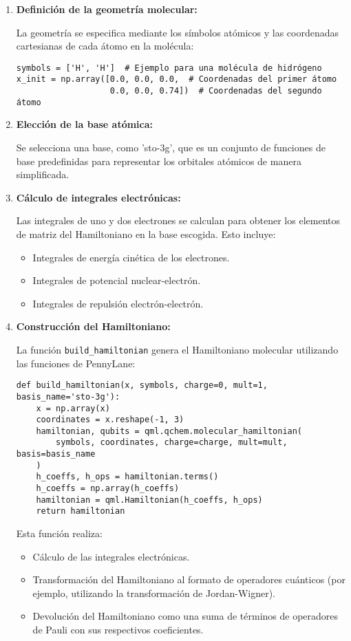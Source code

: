 \begin{enumerate}
    \item \textbf{Definición de la geometría molecular:}
    
    La geometría se especifica mediante los símbolos atómicos y las coordenadas cartesianas de cada átomo en la molécula:
    
    \begin{verbatim}
symbols = ['H', 'H']  # Ejemplo para una molécula de hidrógeno
x_init = np.array([0.0, 0.0, 0.0,  # Coordenadas del primer átomo
                   0.0, 0.0, 0.74])  # Coordenadas del segundo átomo
    \end{verbatim}
    
    \item \textbf{Elección de la base atómica:}
    
    Se selecciona una base, como 'sto-3g', que es un conjunto de funciones de base predefinidas para representar los orbitales atómicos de manera simplificada.
    
    \item \textbf{Cálculo de integrales electrónicas:}
    
    Las integrales de uno y dos electrones se calculan para obtener los elementos de matriz del Hamiltoniano en la base escogida. Esto incluye:
    \begin{itemize}
        \item Integrales de energía cinética de los electrones.
        \item Integrales de potencial nuclear-electrón.
        \item Integrales de repulsión electrón-electrón.
    \end{itemize}
    
    \item \textbf{Construcción del Hamiltoniano:}
    
    La función \texttt{build\_hamiltonian} genera el Hamiltoniano molecular utilizando las funciones de PennyLane:
    
    \begin{verbatim}
def build_hamiltonian(x, symbols, charge=0, mult=1, basis_name='sto-3g'):
    x = np.array(x)
    coordinates = x.reshape(-1, 3)
    hamiltonian, qubits = qml.qchem.molecular_hamiltonian(
        symbols, coordinates, charge=charge, mult=mult, basis=basis_name
    )
    h_coeffs, h_ops = hamiltonian.terms()
    h_coeffs = np.array(h_coeffs)
    hamiltonian = qml.Hamiltonian(h_coeffs, h_ops)
    return hamiltonian
    \end{verbatim}
    
    Esta función realiza:
    \begin{itemize}
        \item Cálculo de las integrales electrónicas.
        \item Transformación del Hamiltoniano al formato de operadores cuánticos (por ejemplo, utilizando la transformación de Jordan-Wigner).
        \item Devolución del Hamiltoniano como una suma de términos de operadores de Pauli con sus respectivos coeficientes.
    \end{itemize}
\end{enumerate}

